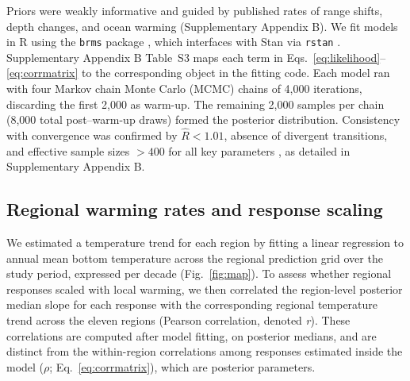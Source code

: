 \documentclass[9pt,twocolumn,twoside]{pnas-new}
\begin{document}
{Priors were weakly informative and guided by published rates of range shifts, depth changes, and ocean warming (Supplementary Appendix B). We fit models in R using the \texttt{brms} package \citep{burkner_brms_2017}, which interfaces with Stan via \texttt{rstan} \citep{stan2024,stan_development_team_rstan_2024}. Supplementary Appendix B Table~S3 maps each term in Eqs.~\ref{eq:likelihood}--\ref{eq:corrmatrix} to the corresponding object in the fitting code. Each model ran with four Markov chain Monte Carlo (MCMC) chains of 4,000 iterations, discarding the first 2,000 as warm-up. The remaining 2,000 samples per chain (8,000 total post–warm-up draws) formed the posterior distribution. Consistency with convergence was confirmed by $\hat{R} < 1.01$, absence of divergent transitions, and effective sample sizes $> 400$ for all key parameters \citep{vehtari_rank-normalization_2021}, as detailed in Supplementary Appendix B.

\subsection*{Regional warming rates and response scaling}
We estimated a temperature trend for each region by fitting a linear regression to annual mean bottom temperature across the regional prediction grid over the study period, expressed per decade (Fig.~\ref{fig:map}). To assess whether regional responses scaled with local warming, we then correlated the region-level posterior median slope for each response with the corresponding regional temperature trend across the eleven regions (Pearson correlation, denoted \textit{r}). These correlations are computed after model fitting, on posterior medians, and are distinct from the within-region correlations among responses estimated inside the model ($\rho$; Eq.~\ref{eq:corrmatrix}), which are posterior parameters.
}


\showmatmethods{} %

\end{document}
